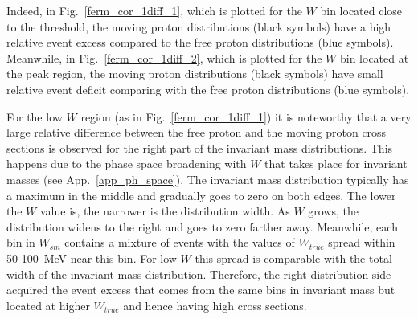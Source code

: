 


Indeed, in Fig.~\ref{ferm_cor_1diff_1}, which is plotted for the $W$ bin located close to the threshold, the moving proton distributions (black symbols) have a high relative event excess compared to the free proton distributions (blue symbols). Meanwhile, in Fig.~\ref{ferm_cor_1diff_2}, which is plotted for the $W$ bin located at the peak region, the moving proton distributions (black symbols) have small relative event deficit comparing with the free proton distributions (blue symbols). 

For the low $W$ region (as in Fig.~\ref{ferm_cor_1diff_1}) it is noteworthy that a very large relative difference between the free proton and the moving proton cross sections is observed for the right part of the invariant mass distributions. This happens due to the phase space broadening with $W$ that takes place for invariant masses (see App.~\ref{app_ph_space}). The invariant mass distribution typically has a maximum in the middle and gradually goes to zero on both edges. The lower the $W$ value is, the narrower is the distribution width. As $W$ grows, the distribution widens to the right and goes to zero farther away. Meanwhile, each bin in $W_{sm}$ contains a mixture of events with the values of $W_{true}$ spread within 50-100~MeV near this bin. For low $W$ this spread is comparable with the total  width of the invariant mass distribution. Therefore, the right distribution side acquired the event excess that comes from the same bins in invariant mass but located at higher $W_{true}$ and hence having high cross sections.



